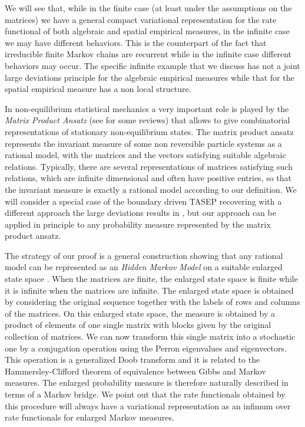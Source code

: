 \documentclass[reqno]{amsart}
\theoremstyle{plain}
\theoremstyle{definition}
\theoremstyle{remark}
\numberwithin{equation}{section}
\numberwithin{theorem}{section}
\newcommand{\<}{\langle}
\renewcommand{\>}{\rangle}
\begin{document}
	\smallskip
	We will see that, while in the finite case (at least under the assumptions on the matrices) we have a general compact variational representation for the rate functional of both algebraic and spatial empirical measures, in the infinite case we may have different behaviors. This is the counterpart of the fact that irreducible finite Markov chains are recurrent while in the infinite case different behaviors may occur. The specific infinite example that we discuss has not a joint large deviations principle for the algebraic empirical measures while that for the spatial empirical measure has a non local structure.
	
	\smallskip
	
	In non-equilibrium statistical mechanics a very important role is played by the {\it Matrix Product Ansatz} (see \cite{reviewhold,review} for some reviews) that allows to give combinatorial representations of stationary non-equilibrium states. The matrix product ansatz represents the invariant measure of some non reversible particle systems as a rational model, with the matrices and the vectors satisfying suitable algebraic relations. Typically, there are several representations of matrices satisfying such relations, which are infinite dimensional and often have positive entries, so that the invariant measure is exactly a rational model according to our definition. We will consider a special case of the boundary driven TASEP recovering with a different approach the large deviations results in \cite{Der5,Derr7,Bryc}, but our approach can be applied in principle to any probability measure represented by the matrix product ansatz.
	
	\smallskip
	
	The strategy of our proof is a general construction showing that any rational model can be represented as an {\it Hidden Markov Model} on a suitable enlarged state space \cite{GI1}. When the matrices are finite, the enlarged state space is finite while it is infinite when the matrices are infinite. The enlarged state space is obtained by considering the original sequence together with the labels of rows and columns of the matrices. On this enlarged state space, the measure is obtained by a product of elements of one single matrix with blocks given by the original collection of matrices. We can now transform this single matrix into a stochastic one by a conjugation operation using the Perron eigenvalues and eigenvectors. This operation is a generalized Doob transform and it is related to the Hammersley-Clifford theorem of equivalence between Gibbs and Markov measures. The enlarged probability measure is therefore naturally described in terms of a Markov bridge.  We point out that the rate functionals obtained by this procedure will always have a variational representation as an infimum over rate functionals for enlarged Markov measures.
	
\end{document}
